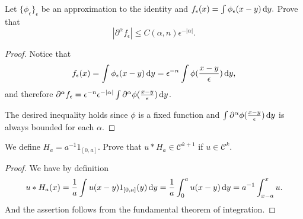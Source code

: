 \documentclass[
    ]{article}
\begin{document}
    \begin{exercise}
        Let $\{\phi_\epsilon\}_\epsilon$ be an approximation to the identity and $f_\epsilon(x)=\int \phi_\epsilon(x-y)\mathop{}\!\mathrm{d} y.$ Prove that 
        \[|\partial^\alpha f_\epsilon|\le C(\alpha,n)\epsilon^{-|\alpha|}.\]
    \end{exercise}

    \begin{proof}
        Notice that
        \[f_\epsilon(x)=\int\phi_\epsilon(x-y)\mathop{}\!\mathrm{d} y=\epsilon^{-n}\int\phi(\frac{x-y}\epsilon)\mathop{}\!\mathrm{d} y,\]
        and therefore $\partial^\alpha f_\epsilon=\epsilon^{-n}\epsilon^{-|\alpha|}\int\partial^\alpha\phi(\frac{x-y}\epsilon)\mathop{}\!\mathrm{d} y$.

        The desired inequality holds since $\phi$ is a fixed function and $\int\partial^\alpha\phi(\frac{x-y}\epsilon)\mathop{}\!\mathrm{d} y$ is always bounded for each $\alpha$.
    \end{proof}


    \begin{exercise}
        We define $H_a=a^{-1}1_{[0,a]}$. Prove that $u*H_a\in\mathscr C^{k+1}$ if $u\in\mathscr C^k$.
    \end{exercise}
    \begin{proof}
        We have by definition 
        \[u*H_a(x)=\frac1a\int u(x-y)1_{[0,a]}(y)\mathop{}\!\mathrm{d} y=\frac1a\int_0^au(x-y)\mathop{}\!\mathrm{d} y=a^{-1}\int_{x-a}^xu.\]
        And the assertion follows from the fundamental theorem of integration.
    \end{proof}
\end{document}
